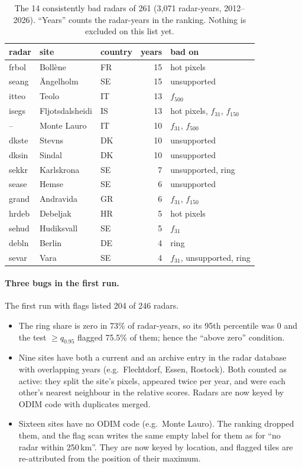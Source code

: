 \documentclass[11pt,a4paper]{article}
\theoremstyle{definition}
\theoremstyle{remark}
\newcommand{\1}{\mathbf{1}}
\begin{document}
\begin{table}[h]
\centering\small
\begin{tabular}{@{}lllrl@{}}
\toprule
radar & site & country & years & bad on \\ \midrule
frbol & Bollène & FR & 15 & hot pixels \\
seang & Ängelholm & SE & 15 & unsupported \\
itteo & Teolo & IT & 13 & $f_{500}$ \\
isegs & Fljotsdalsheidi & IS & 13 & hot pixels, $f_{31}$, $f_{150}$ \\
-- & Monte Lauro & IT & 10 & $f_{31}$, $f_{500}$ \\
dkste & Stevns & DK & 10 & unsupported \\
dksin & Sindal & DK & 10 & unsupported \\
sekkr & Karlskrona & SE & 7 & unsupported, ring \\
sease & Hemse & SE & 6 & unsupported \\
grand & Andravida & GR & 6 & $f_{31}$, $f_{150}$ \\
hrdeb & Debeljak & HR & 5 & hot pixels \\
sehud & Hudiksvall & SE & 5 & $f_{31}$ \\
debln & Berlin & DE & 4 & ring \\
sevar & Vara & SE & 4 & $f_{31}$, unsupported, ring \\ \bottomrule
\end{tabular}
\caption{The 14 consistently bad radars of 261 (3,071 radar-years, 2012--2026). ``Years''
counts the radar-years in the ranking. Nothing is excluded on this list yet.}
\label{tab:radars}
\end{table}

\paragraph{Three bugs in the first run.} The first run with flags listed 204 of 246 radars.
\begin{itemize}[nosep]
\item The ring share is zero in 73\% of radar-years, so its 95th percentile was 0 and the
  test $\ge q_{0.95}$ flagged 75.5\% of them; hence the ``above zero'' condition.
\item Nine sites have both a current and an archive entry in the radar database with
  overlapping years (e.g.\ Flechtdorf, Essen, Rostock). Both counted as active: they split
  the site's pixels, appeared twice per year, and were each other's nearest neighbour in
  the relative scores. Radars are now keyed by ODIM code with duplicates merged.
\item Sixteen sites have no ODIM code (e.g.\ Monte Lauro). The ranking dropped them, and the
  flag scan writes the same empty label for them as for ``no radar within 250\,km''. They are
  now keyed by location, and flagged tiles are re-attributed from the position of their
  maximum.
\end{itemize}
\end{document}
